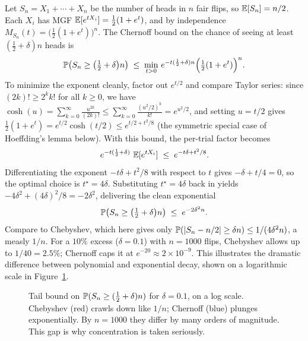 \begin{example}
\label{ch19:ex-chernoff-coins}
Let $S_n = X_1 + \cdots + X_n$ be the number of heads in $n$ fair flips, so
$\E[S_n] = n/2$. Each $X_i$ has MGF
$\E[e^{tX_i}] = \tfrac12(1 + e^{t})$, and by independence
$M_{S_n}(t) = \bigl(\tfrac12(1+e^t)\bigr)^n$. The Chernoff bound on the chance
of seeing at least $(\tfrac12 + \delta)n$ heads is
\[
  \P\!\left(S_n \ge \bigl(\tfrac12+\delta\bigr)n\right)
  \;\le\;
  \min_{t>0}\, e^{-t(\frac12+\delta)n}\Bigl(\tfrac12(1+e^t)\Bigr)^n .
\]
To minimize the exponent cleanly, factor out $e^{t/2}$ and compare Taylor series:
since $(2k)! \ge 2^k k!$ for all $k\ge 0$, we have
$\cosh(u) = \sum_{k=0}^\infty \frac{u^{2k}}{(2k)!} \le \sum_{k=0}^\infty \frac{(u^2/2)^k}{k!} = e^{u^2/2}$,
and setting $u = t/2$ gives $\tfrac12(1+e^t) = e^{t/2}\cosh(t/2) \le e^{t/2 + t^2/8}$
(the symmetric special case of Hoeffding's lemma below). With this bound, the
per-trial factor becomes
\[
  e^{-t(\frac12+\delta)}\,\E[e^{tX_i}] \;\le\; e^{-t\delta + t^2/8}.
\]
Differentiating the exponent $-t\delta + t^2/8$ with respect to $t$ gives
$-\delta + t/4 = 0$, so the optimal choice is $t^\star = 4\delta$. Substituting
$t^\star = 4\delta$ back in yields $-4\delta^2 + (4\delta)^2/8 = -2\delta^2$,
delivering the clean exponential
\[
  \P\!\left(S_n \ge \bigl(\tfrac12+\delta\bigr)n\right)
  \;\le\; e^{-2\delta^2 n}.
\]
Compare to Chebyshev, which here gives only
$\P(\abs{S_n - n/2}\ge \delta n) \le 1/(4\delta^2 n)$, a measly $1/n$. For a
$10\%$ excess ($\delta = 0.1$) with $n = 1000$ flips, Chebyshev allows up to
$1/40 = 2.5\%$; Chernoff caps it at $e^{-20} \approx 2\times 10^{-9}$. This
illustrates the dramatic difference between polynomial and exponential decay,
shown on a logarithmic scale in Figure~\ref{ch19:fig-chernoff-vs-cheb}.
\end{example}

\begin{figure}[H]
\centering
{}
\caption{Tail bound on $\P(S_n \ge (\tfrac12+\delta)n)$ for $\delta=0.1$, on a
log scale. Chebyshev (red) crawls down like $1/n$; Chernoff (blue) plunges
exponentially. By $n=1000$ they differ by many orders of magnitude. This gap
is why concentration is taken seriously.}
\label{ch19:fig-chernoff-vs-cheb}
\end{figure}

